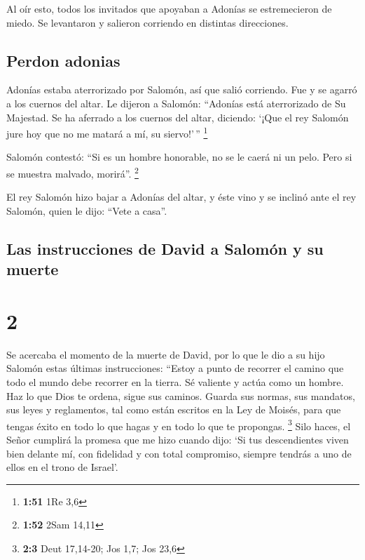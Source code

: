  Al oír esto, todos los invitados que apoyaban a Adonías
se estremecieron de miedo. Se levantaron y salieron corriendo en
distintas direcciones.

\hypertarget{perdon-adonias}{%
\subsection{Perdon adonias}\label{perdon-adonias}}

 Adonías estaba aterrorizado por Salomón, así que salió
corriendo. Fue y se agarró a los cuernos del altar.  Le
dijeron a Salomón: ``Adonías está aterrorizado de Su Majestad. Se ha
aferrado a los cuernos del altar, diciendo: `¡Que el rey Salomón jure
hoy que no me matará a mí, su siervo!'\,'' \footnote{\textbf{1:51} 1Re
  3,6}

 Salomón contestó: ``Si es un hombre honorable, no se le
caerá ni un pelo. Pero si se muestra malvado, morirá''. \footnote{\textbf{1:52}
  2Sam 14,11}

 El rey Salomón hizo bajar a Adonías del altar, y éste
vino y se inclinó ante el rey Salomón, quien le dijo: ``Vete a casa''.

\hypertarget{las-instrucciones-de-david-a-salomuxf3n-y-su-muerte}{%
\subsection{Las instrucciones de David a Salomón y su
muerte}\label{las-instrucciones-de-david-a-salomuxf3n-y-su-muerte}}

\hypertarget{section-1}{%
\section{2}\label{section-1}}

 Se acercaba el momento de la muerte de David, por lo que
le dio a su hijo Salomón estas últimas instrucciones: 
``Estoy a punto de recorrer el camino que todo el mundo debe recorrer en
la tierra. Sé valiente y actúa como un hombre.  Haz lo que
Dios te ordena, sigue sus caminos. Guarda sus normas, sus mandatos, sus
leyes y reglamentos, tal como están escritos en la Ley de Moisés, para
que tengas éxito en todo lo que hagas y en todo lo que te propongas.
\footnote{\textbf{2:3} Deut 17,14-20; Jos 1,7; Jos 23,6} 
Silo haces, el Señor cumplirá la promesa que me hizo cuando dijo: `Si
tus descendientes viven bien delante mí, con fidelidad y con total
compromiso, siempre tendrás a uno de ellos en el trono de Israel'.


